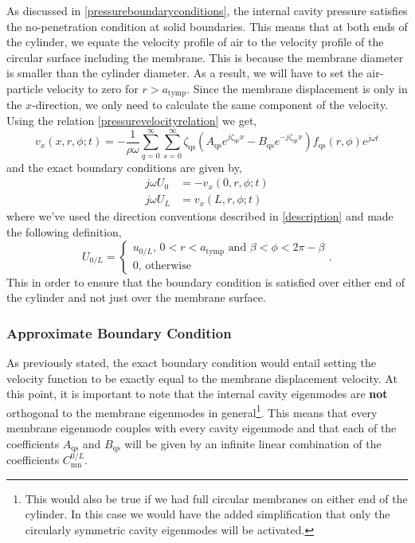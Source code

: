 As discussed in \ref{pressureboundaryconditions}, the internal cavity pressure satisfies the no-penetration condition at solid boundaries.
This means that at both ends of the cylinder, we equate the velocity profile of air to the velocity profile of the circular surface including
the membrane. This is because the membrane diameter is smaller than the cylinder diameter. As a result, we will have to set the air-particle velocity to zero for $r>a_{\mathrm{tymp}}$. 
Since the membrane displacement is
only in the $x$-direction, we only need to calculate the same component of the velocity. Using the relation \eqref{pressurevelocityrelation} we get,
\begin{equation}\label{airvelocity}
v_x(x,r,\phi;t)=-\frac{1}{\rho\omega}\displaystyle\sum^\infty_{q=0}\displaystyle\sum^\infty_{s=0}\zeta_{\mathrm{qs}}\left(A_{\mathrm{qs}}e^{j\zeta_{\mathrm{qs}}x}-B_{\mathrm{qs}}e^{-j\zeta_{\mathrm{qs}}x}\right)f_{\mathrm{qs}}(r,\phi)e^{j\omega t}
\end{equation}
and the exact boundary conditions are given by,
\begin{align}
 j\omega U_{0}&=-v_x(0,r,\phi;t)\label{bc1}\\
 j\omega U_{L}&=v_x(L,r,\phi;t)\label{bc2}
 \end{align}
where we've used the direction conventions described in \ref{description} and made the following definition,
\begin{equation}
 U_{0/L}=\begin{cases}
          u_{0/L}\mbox{, } 0<r<a_{\mathrm{tymp}}\mbox{ and } \beta<\phi<2\pi-\beta\\
          0\mbox{, otherwise}
         \end{cases}.
\end{equation}
This in order to ensure that the boundary condition is satisfied over either end of the cylinder and not just over the membrane surface.
\subsubsection{Approximate Boundary Condition}
As previously stated, the exact boundary condition would entail setting the velocity function to be exactly equal to the membrane displacement velocity. At this point, it is important to
note that the internal cavity eigenmodes are \textbf{not} orthogonal to the membrane eigenmodes in general\footnote{This would also be true if we had full circular membranes on either end of the
cylinder. In this case we would have the added simplification that only the circularly symmetric cavity eigenmodes will be activated.}. This means that every membrane eigenmode
couples with every cavity eigenmode and that each of the coefficients $A_{\mathrm{qs}}$ and $B_{\mathrm{qs}}$ will be given by an infinite linear combination of the coefficients $C^{0/L}_{\mathrm{mn}}$. 

